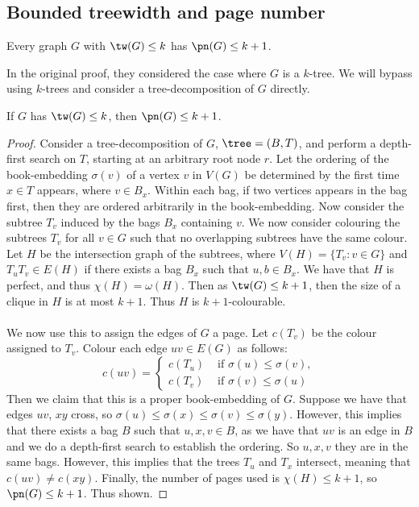 \subsection{Bounded treewidth and page number}\label{ssec:Bounded_Treewidth}
\begin{theorem}\label{thm:bded_treewidth_bded_pagenumber}
	Every graph $G$ with $\tw(G) \leq k$ has $\pn(G) \leq k + 1$. 
\end{theorem}
In the original proof, they considered the case where $G$ is a $k$-tree. We will bypass using $k$-trees and consider a tree-decomposition of $G$ directly. 

\begin{theorem}
	If $G$ has $\tw(G) \leq k$, then $\pn(G) \leq k + 1$. 
\end{theorem}
\begin{proof}
	Consider a tree-decomposition of $G$, $\tree = (B, T)$, and perform a depth-first search on $T$, starting at an arbitrary root node $r$. Let the ordering of the book-embedding $\sigma(v)$ of a vertex $v$ in $V(G)$ be determined by the first time $x \in T$ appears, where $v \in B_x$. Within each bag, if two vertices appears in the bag first, then they are ordered arbitrarily in the book-embedding. Now consider the subtree $T_v$ induced by the bags $B_x$ containing $v$. We now consider colouring the subtrees $T_v$ for all $v \in G$ such that no overlapping subtrees have the same colour. Let $H$ be the intersection graph of the subtrees, where $V(H) = \lbrace T_v : v \in G \rbrace$ and $T_u T_v \in E(H)$ if there exists a bag $B_x$ such that $u, b \in B_x$. We have that $H$ is perfect, and thus $\chi(H) = \omega(H)$. Then as $\tw(G) \leq k + 1$, then the size of a clique in $H$ is at most $k + 1$. Thus $H$ is $k + 1$-colourable.
	\paragraph{}
	We now use this to assign the edges of $G$ a page. Let $c(T_v)$ be the colour assigned to $T_v$. Colour each edge $uv \in E(G)$ as follows:
	\begin{equation}
		c(uv) = 
		\begin{cases}
			c(T_u) &\text{ if } \sigma(u) \leq \sigma(v),\\
			c(T_v) &\text{ if } \sigma(v) \leq \sigma(u)
		\end{cases}
	\end{equation}
	Then we claim that this is a proper book-embedding of $G$. Suppose we have that edges $uv$, $xy$ cross, so $\sigma(u) \leq \sigma(x) \leq \sigma(v) \leq \sigma(y)$. However, this implies that there exists a bag $B$ such that $u, x, v \in B$, as we have that $uv$ is an edge in $B$ and we do a depth-first search to establish the ordering. So $u, x, v$ they are in the same bags. However, this implies that the trees $T_u$ and $T_x$ intersect, meaning that $c(uv) \neq c(xy)$. Finally, the number of pages used is $\chi(H) \leq k + 1$, so $\pn(G) \leq k + 1$. Thus shown.
\end{proof}

